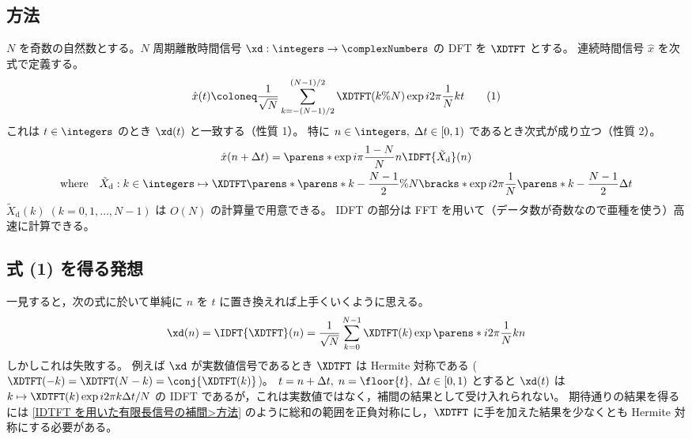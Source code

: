         \subsection{方法}
            \label{IDFT を用いた周期信号の補間>方法}
            \newcommand*{\Xtilded}{\tilde{X}_\text{d}}
            $N$ を奇数の自然数とする。$N$ 周期離散時間信号 $\xd:\integers\to\complexNumbers$ の DFT を $\XDTFT$ とする。
            連続時間信号 $\hat{x}$ を次式で定義する。
            \[ \hat{x}(t) \coloneq \frac{1}{\sqrt{N}}\sum_{k=-(N-1)/2}^{(N-1)/2}\XDTFT(k\%N)\exp i2\pi\frac{1}{N}kt \tag{1} \]
            これは $t\in\integers$ のとき $\xd(t)$ と一致する（性質 1）。
            特に $n\in\integers,\;\Delta t\in[0,1)$ であるとき次式が成り立つ（性質 2）。
            \begin{gather}
                \hat{x}(n+\Delta t) = \parens*{\exp i\pi\frac{1-N}{N}n}\IDFT{\Xtilded}(n) \label{IDFT を用いた周期信号の補間>公式}\\
                \text{where} \quad \Xtilded:k\in\integers\mapsto\XDTFT\parens*{\parens*{k-\frac{N-1}{2}}\%N}\bracks*{\exp i2\pi\frac{1}{N}\parens*{k-\frac{N-1}{2}}\Delta t} \nonumber
            \end{gather}
            $\Xtilded(k)\;(k=0,1,\dots,N-1)$ は $O(N)$ の計算量で用意できる。
            IDFT の部分は FFT を用いて（データ数が奇数なので亜種を使う）高速に計算できる。
        \subsection{式 (1) を得る発想}
            一見すると，次の式に於いて単純に $n$ を $t$ に置き換えれば上手くいくように思える。
            \[ \xd(n) = \IDFT{\XDTFT}(n) = \frac{1}{\sqrt{N}}\sum_{k=0}^{N-1}\XDTFT(k)\exp\parens*{i2\pi\frac{1}{N}kn} \]
            しかしこれは失敗する。
            例えば $\xd$ が実数値信号であるとき $\XDTFT$ は Hermite 対称である ($\XDTFT(-k)=\XDTFT(N-k)=\conj{\XDTFT(k)}$)。
            $t=n+\Delta t,\;n=\floor{t},\;\Delta t\in[0,1)$ とすると $\xd(t)$ は $k\mapsto\XDTFT(k)\exp i2\pi k\Delta t/N$ の IDFT であるが，これは実数値ではなく，補間の結果として受け入れられない。
            期待通りの結果を得るには \ref{IDTFT を用いた有限長信号の補間>方法} のように総和の範囲を正負対称にし，$\XDTFT$ に手を加えた結果を少なくとも Hermite 対称にする必要がある。
